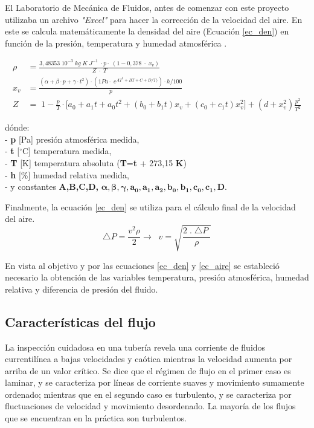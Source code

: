 
El Laboratorio de Mecánica de Fluidos, antes de comenzar con este proyecto utilizaba un archivo \textit{"Excel"} para hacer la corrección de la velocidad del aire. En este se calcula matemáticamente la densidad del aire (Ecuación \ref{ec_den}) en función de la presión, temperatura y humedad atmosférica \cite{airecalculo}.

\begin{align}
	\rho&=\frac{3,48353\;10^{-3}\;kg\;K\;J^{-1}\;\cdot p\cdot\;(1-0,378\;\cdot\;x_v)}{Z\;\cdot\;T} \label{ec_den}\\
	x_v&=\frac{(\alpha+\beta\cdot p+\gamma\cdot t^2)\cdot(1Pa\cdot\;e^{AT^2+BT+C+D/T)})\cdot h/100}p\\
	Z&=\;1-\frac pT\cdot\lbrack a_0+a_1t+a_0t^2+(b_0+b_1t)x_v+(c_0+c_1t)x_v^2\rbrack+(d+x_v^2)\frac{p^2}{T^2}
\end{align}

dónde:\\
- \textbf{p } [Pa] presión atmosférica medida,\\
- \textbf{t } [$^{\circ}$C] temperatura medida,\\
- \textbf{T } [K] temperatura absoluta (\textbf{T}=\textbf{t} + 273,15 \textbf{K})\\
- \textbf{h } [\%] humedad relativa medida,\\
- y constantes \textbf{A,B,C,D,} $\boldsymbol{\alpha , \beta  , \gamma , a_0, a_1 ,a_2 ,b_0  ,b_1 , c_0 , c_1, D. }$


Finalmente, la ecuación  \ref{ec_den} se utiliza para el cálculo final de la velocidad del aire.
\begin{equation}
	\triangle P=\frac{v^2\rho}2\rightarrow\;\;v=\sqrt{\frac{2\;.\;\triangle P\;}\rho}
	\label{ec_aire}
\end{equation}

En vista al objetivo y por las ecuaciones \ref{ec_den} y \ref{ec_aire} se estableció necesario la obtención de las variables temperatura, presión atmosférica, humedad relativa y diferencia de presión del fluido. 

\subsection{Características del flujo}
La inspección cuidadosa en una tubería revela una corriente de fluidos currentilínea a bajas velocidades y caótica mientras la velocidad aumenta por arriba de un valor crítico. Se dice que el régimen de flujo en el primer caso es laminar, y se caracteriza por líneas de corriente suaves y movimiento sumamente
ordenado; mientras que en el segundo caso es turbulento, y se caracteriza por
fluctuaciones de velocidad y movimiento  desordenado. La mayoría de los flujos que se encuentran en la
práctica son turbulentos. 

